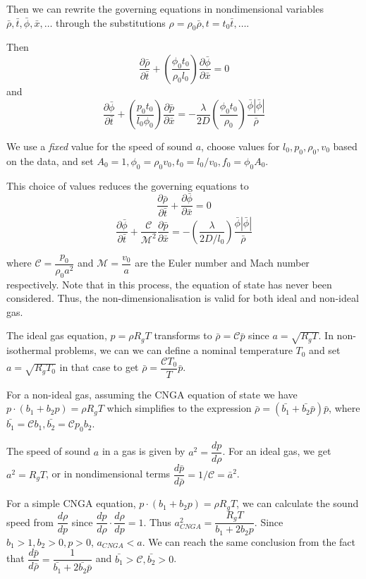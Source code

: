 \documentclass{amsart}
\begin{document}
Then we can rewrite the governing equations in nondimensional variables $\bar{\rho}, \bar{t},\bar{\phi}, \bar{x}, \dotsc$  through the substitutions $\rho = \rho_0 \bar{\rho}, t = t_0\bar{t}, \dotsc$.

Then $$\dfrac{\partial \bar{\rho}}{\partial \bar{t}} + \left( \dfrac{\phi_0t_0}{\rho_0l_0} \right)\dfrac{\partial \bar{\phi}}{\partial \bar{x}} = 0$$
and
$$\dfrac{\partial \bar{\phi}}{\partial \bar{t}} + \left( \dfrac{p_0t_0}{l_0\phi_0} \right)\dfrac{\partial \bar{p}}{\partial \bar{x}} = -\dfrac{\lambda}{2D}\left( \dfrac{\phi_0t_0}{\rho_0} \right) \dfrac{\bar{\phi}|\bar{\phi}|}{\bar{\rho}}$$

We use a \emph{fixed} value for the speed of sound $a$, choose values for $l_0, p_0, \rho_0, v_0$ based on the data, and set $A_0 =1, \phi_0 = \rho_0 v_0, t_0 = l_0/v_0, f_0 = \phi_0 A_0$.

This choice of values reduces the governing equations to 
$$\dfrac{\partial \bar{\rho}}{\partial \bar{t}} + \dfrac{\partial \bar{\phi}}{\partial \bar{x}} = 0$$
$$\dfrac{\partial \bar{\phi}}{\partial \bar{t}} + \dfrac{\mathcal{C}}{\mathcal{M}^2}\dfrac{\partial \bar{p}}{\partial \bar{x}} = -\left( \dfrac{\lambda}{2D/l_0} \right) \dfrac{\bar{\phi}|\bar{\phi}|}{\bar{\rho}}$$

where $\mathcal{C} =  \dfrac{p_0}{\rho_0 a^2}$ and $\mathcal{M} = \dfrac{v_0}{a}$ are the Euler number and Mach number respectively.
Note that in this process, the equation of state has never been considered. Thus, the non-dimensionalisation is valid for both ideal and non-ideal gas. 


The ideal gas equation, $p = \rho R_g T$ transforms to $\bar{\rho} = \mathcal{C} \bar{p}$ since $a = \sqrt{R_gT}$. In non-isothermal problems, we can we can define a nominal temperature $T_0$  and set $a=\sqrt{R_gT_0}$ in that case to get $\bar{\rho} = \dfrac{\mathcal{C}T_0}{T} \bar{p}$.

For a non-ideal gas, assuming the CNGA equation of state we have $p\cdot(b_1 + b_2 p) = \rho R_g T$ which simplifies to the expression $\bar{\rho} = \left ( \bar{b_1} + \bar{b_2}\bar{p} \right ) \bar{p}$, where $\bar{b_1} = \mathcal{C}b_1, \bar{b_2} = \mathcal{C}p_0 b_2$. 

The speed of sound $a$ in a gas  is given by $a^2 = \dfrac{d p}{d \rho}$. For an ideal gas, we get $a^2 = R_g T$, or in nondimensional terms  $\dfrac{d \bar{p}}{d \bar{\rho}} = 1/\mathcal{C} = \bar{a}^2 $.

For a simple CNGA equation, $p\cdot(b_1 + b_2 p) = \rho R_g T$, we can calculate the sound speed from $\dfrac{d \rho}{d p}$ since $\dfrac{d p}{d \rho} \cdot \dfrac{d \rho}{d p} = 1$. Thus  $a_{CNGA}^2 = \dfrac{R_g T}{b_1 + 2b_2 p}$. Since $b_1 > 1, b_2 > 0, p > 0$, $a_{CNGA} < a$.
We can reach the same conclusion from the fact that  $\dfrac{d \bar{p}}{d \bar{\rho}} = \dfrac{1}{\bar{b_1} + 2\bar{b_2}\bar{p}}$ and $\bar{b_1} > \mathcal{C}, \bar{b_2} > 0$.
\end{document}
